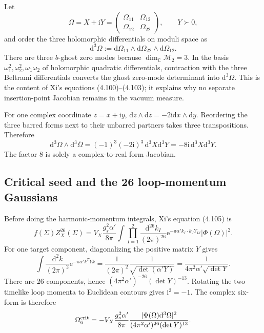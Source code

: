 \documentclass[11pt]{article}
\numberwithin{equation}{section}
\newcommand{\A}{\alpha'}
\newcommand{\dd}{\mathrm d}
\newcommand{\ee}{\mathrm e}
\newcommand{\ii}{\mathrm i}
\newcommand{\cM}{\mathcal M}
\begin{document}
Let
\begin{equation}
 \Omega=X+\ii Y=\begin{pmatrix}\Omega_{11}&\Omega_{12}\\
 \Omega_{12}&\Omega_{22}\end{pmatrix},
 \qquad Y\succ0,
\end{equation}
and order the three holomorphic differentials on moduli space as
\begin{equation}
 \dd^3\Omega:=\dd\Omega_{11}\wedge\dd\Omega_{22}
 \wedge\dd\Omega_{12}.
 \label{eq:d3omega-order}
\end{equation}
There are three $b$-ghost zero modes because
$\dim_{\mathbb C}\cM_2=3$.  In the basis
$\omega_1^2,\omega_2^2,\omega_1\omega_2$ of holomorphic quadratic
differentials, contraction with the three Beltrami differentials converts the
ghost zero-mode determinant into $\dd^3\Omega$.  This is the content of Xi's
equations (4.100)--(4.103); it explains why no separate insertion-point
Jacobian remains in the vacuum measure.

For one complex coordinate $z=x+\ii y$,
$\dd z\wedge\dd\bar z=-2\ii\dd x\wedge\dd y$.  Reordering the three barred
forms next to their unbarred partners takes three transpositions.  Therefore
\begin{equation}
 \dd^3\Omega\wedge\dd^3\bar\Omega
 =(-1)^3(-2\ii)^3\,\dd^3X\dd^3Y
 =-8\ii\,\dd^3X\dd^3Y.
 \label{eq:six-form-jacobian-full}
\end{equation}
The factor $8$ is solely a complex-to-real form Jacobian.

\subsection{Critical seed and the 26 loop-momentum Gaussians}

Before doing the harmonic-momentum integrals, Xi's equation (4.105) is
\begin{equation}
 f(\Sigma)Z_X^{26}(\Sigma)
 =V_X\frac{g_s^2\A}{8\pi}
 \int\prod_{I=1}^{2}\frac{\dd^{26}k_I}{(2\pi)^{26}}
 \ee^{-\pi\A k_I\cdot k_JY_{IJ}}
 |\Phi(\Omega)|^2.
 \label{eq:xi-4105-full}
\end{equation}
For one target component, diagonalizing the positive matrix $Y$ gives
\begin{equation}
 \int\frac{\dd^2k}{(2\pi)^2}\ee^{-\pi\A k^TYk}
 =\frac1{(2\pi)^2}\frac1{\sqrt{\det(\A Y)}}
 =\frac1{4\pi^2\A\sqrt{\det Y}}.
 \label{eq:two-loop-gaussian-full}
\end{equation}
There are 26 components, hence
$(4\pi^2\A)^{-26}(\det Y)^{-13}$.  Rotating the two timelike loop momenta
to Euclidean contours gives $\ii^2=-1$.  The complex six-form is therefore
\begin{equation}
 \Omega_6^{\rm crit}
 =-V_X\frac{g_s^2\A}{8\pi}
 \frac{|\Phi(\Omega)\dd^3\Omega|^2}
 {(4\pi^2\A)^{26}(\det Y)^{13}}.
 \label{eq:critical-six-form-full}
\end{equation}
\end{document}
